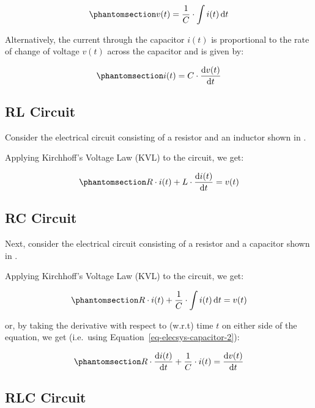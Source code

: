\documentclass[
  14pt,
  a4paper,
  oneside,
  open=any,
  a4paper,
  14pt]{report}
\begin{document}
\begin{equation}\phantomsection\label{eq-elecsys-capacitor-1}{
    v(t) = \dfrac{1}{C} \cdot \int i(t) \odif{t}
}\end{equation}

Alternatively, the current through the capacitor \(i(t)\) is
proportional to the rate of change of voltage \(v(t)\) across the
capacitor and is given by:

\begin{equation}\phantomsection\label{eq-elecsys-capacitor-2}{
    i(t) = C \cdot \odv{v(t)}{t}
}\end{equation}

\subsection{RL Circuit}\label{rl-circuit}

Consider the electrical circuit consisting of a resistor and an inductor
shown in .

Applying Kirchhoff's Voltage Law (KVL) to the circuit, we get:

\begin{equation}\phantomsection\label{eq-elecsys-rl}{
    R\cdot i(t) + L \cdot \odv{i(t)}{t} = v(t)
}\end{equation}

\subsection{RC Circuit}\label{rc-circuit}

Next, consider the electrical circuit consisting of a resistor and a
capacitor shown in .

Applying Kirchhoff's Voltage Law (KVL) to the circuit, we get:

\begin{equation}\phantomsection\label{eq-elecsys-rc-1}{
    R\cdot i(t) + \dfrac{1}{C} \cdot \int i(t) \odif{t} = v(t)
}\end{equation}

or, by taking the derivative with respect to (w.r.t) time \(t\) on
either side of the equation, we get (i.e.~using
Equation~\ref{eq-elecsys-capacitor-2}):

\begin{equation}\phantomsection\label{eq-elecsys-rc-2}{
    R\cdot \odv{i(t)}{t} + \dfrac{1}{C} \cdot i(t) = \odv{v(t)}{t}
}\end{equation}

\subsection{RLC Circuit}\label{rlc-circuit}
\end{document}
